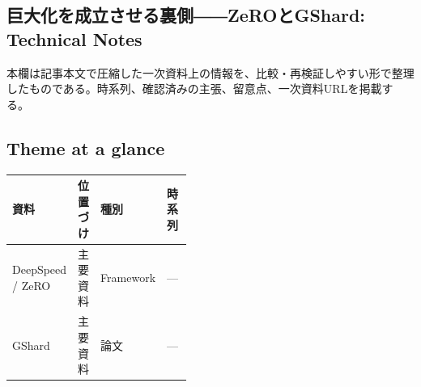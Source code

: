 \subsection*{巨大化を成立させる裏側――ZeROとGShard: Technical Notes}
本欄は記事本文で圧縮した一次資料上の情報を、比較・再検証しやすい形で整理したものである。時系列、確認済みの主張、留意点、一次資料URLを掲載する。
\medskip
\subsection*{Theme at a glance}
\begin{center}
\footnotesize
\begin{tabularx}{\linewidth}{@{}p{0.20\linewidth}p{0.10\linewidth}p{0.14\linewidth}X@{}}
\toprule
資料 & 位置づけ & 種別 & 時系列 \\
\midrule
DeepSpeed / ZeRO & 主要資料 & Framework & — \\
GShard & 主要資料 & 論文 & — \\
\bottomrule
\end{tabularx}
\end{center}
\normalsize

